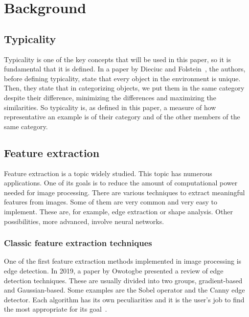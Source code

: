 \documentclass[conference]{IEEEtran}
\begin{document}
	\section{Background}
	
		\subsection{Typicality}
		
			\noindent Typicality is one of the key concepts that will be used in this paper, so it is fundamental that it is defined. In a paper by Dieciuc and Folstein~\cite{dieciuc2019typicality},
			the authors, before defining typicality, state that every object in the environment is unique. Then, they state that in categorizing objects, we put them in the same category 
			despite their difference, minimizing the differences and maximizing the similarities. So typicality is, as defined in this paper, a measure of how representative 
			an example is of their category and of the other members of the same category. 
			

		\subsection{Feature extraction\label{sec:bfe}}

			\noindent Feature extraction is a topic widely studied. 
			This topic has numerous applications. 
			One of its goals is to reduce the amount of computational power needed for image processing. 
			There are various techniques to extract meaningful features from images. 
			Some of them are very common and very easy to implement. 
			These are, for example, edge extraction or shape analysis. 
			Other possibilities, more advanced, involve neural networks.\\

				\subsubsection{Classic feature extraction techniques}
					
					One of the first feature extraction methods implemented in image processing is edge detection.				
					In 2019, a paper by Owotogbe presented a review of edge detection techniques. 
					These are usually divided into two groups, gradient-based and Gaussian-based. 
					Some examples are the Sobel operator and the Canny edge detector. 
					Each algorithm has its own peculiarities and it is the user's job to find 
					the most appropriate for its goal~\cite{owotogbe2019edge}.\\
					
\end{document}
